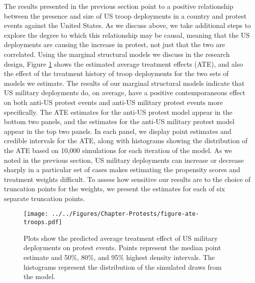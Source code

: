 			The results presented in the previous section point to a positive relationship between the presence and size of US troop deployments in a country and protest events against the United States. As we discuss above, we take additional steps to explore the degree to which this relationship may be causal, meaning that the US deployments are causing the increase in protest, not just that the two are correlated. Using the marginal structural models we discuss in the research design, Figure \ref{fig:atetroops} shows the estimated average treatment effects (ATE), and also the effect of the treatment history of troop deployments for the two sets of models we estimate. The results of our marginal structural models indicate that US military deployments do, on average, have a positive contemporaneous effect on both anti-US protest events and anti-US military protest events more specifically. The ATE estimates for the anti-US protest model appear in the bottom two panels, and the estimates for the anti-US military protest model appear in the top two panels. In each panel, we display point estimates and credible intervals for the ATE, along with histograms showing the distribution of the ATE based on 10,000 simulations for each iteration of the model. As we noted in the previous section, US military deployments can increase or decrease sharply in a particular set of cases makes estimating the propensity scores and treatment weights difficult. To assess how sensitive our results are to the choice of truncation points for the weights, we present the estimates for each of six separate truncation points. 
			
			
			\begin{figure}[t]
				\centering\texttt{[image: ../../Figures/Chapter-Protests/figure-ate-troops.pdf]}
				\caption{Plots show the predicted average treatment effect of US military deployments on protest events. Points represent the median point estimate and 50\%, 80\%, and 95\% highest density intervals. The histograms represent the distribution of the simulated draws from the model.}
				\label{fig:atetroops}
			\end{figure}
			
